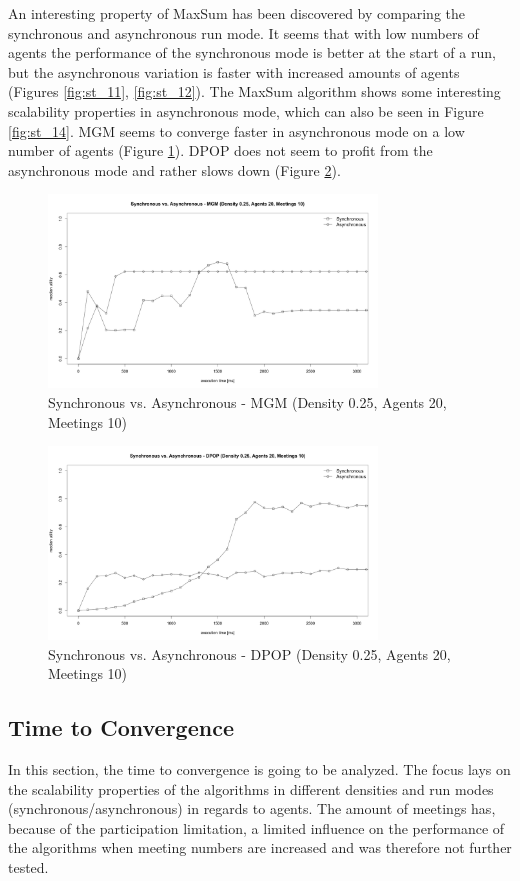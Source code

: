 An interesting property of MaxSum has been discovered by comparing the synchronous and asynchronous run mode. It seems that with low numbers of agents the performance of the synchronous mode is better at the start of a run, but the asynchronous variation is faster with increased amounts of agents (Figures \ref{fig:st_11}, \ref{fig:st_12}). The MaxSum algorithm shows some interesting scalability properties in asynchronous mode, which can also be seen in Figure \ref{fig:st_14}. MGM seems to converge faster in asynchronous mode on a low number of agents (Figure \ref{fig:st_12b}). DPOP does not seem to profit from the asynchronous mode and rather slows down (Figure \ref{fig:st_13}).
\begin{figure}[H]
\centering
\includegraphics[width=330px]{graphics/experiments/static/st_12b}
\caption{Synchronous vs. Asynchronous - MGM (Density 0.25, Agents 20, Meetings 10)}
\label{fig:st_12b}
\end{figure}
\begin{figure}[H]
\centering
\includegraphics[width=330px]{graphics/experiments/static/st_13}
\caption{Synchronous vs. Asynchronous - DPOP (Density 0.25, Agents 20, Meetings 10)}
\label{fig:st_13}
\end{figure}


\subsection{Time to Convergence}
In this section, the time to convergence is going to be analyzed. The focus lays on the scalability properties of the algorithms in different densities and run modes (synchronous/asynchronous) in regards to agents. The amount of meetings has, because of the participation limitation, a limited influence on the performance of the algorithms when meeting numbers are increased and was therefore not further tested.

